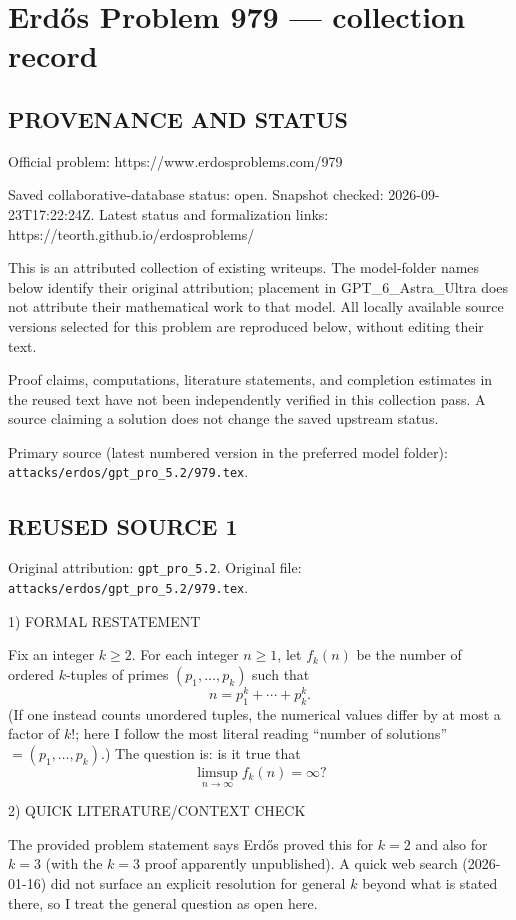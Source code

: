 \section*{Erd\H{o}s Problem 979 --- collection record}

\subsection*{PROVENANCE AND STATUS}
Official problem: https://www.erdosproblems.com/979

Saved collaborative-database status: open.
Snapshot checked: 2026-09-23T17:22:24Z.
Latest status and formalization links: https://teorth.github.io/erdosproblems/

This is an attributed collection of existing writeups. The model-folder names below identify their original attribution; placement in GPT\_6\_Astra\_Ultra does not attribute their mathematical work to that model. All locally available source versions selected for this problem are reproduced below, without editing their text.

Proof claims, computations, literature statements, and completion estimates in the reused text have not been independently verified in this collection pass. A source claiming a solution does not change the saved upstream status.

Primary source (latest numbered version in the preferred model folder): \texttt{attacks/erdos/gpt\_pro\_5.2/979.tex}.

\subsection*{REUSED SOURCE 1}
Original attribution: \texttt{gpt\_pro\_5.2}.
Original file: \texttt{attacks/erdos/gpt\_pro\_5.2/979.tex}.


1) FORMAL RESTATEMENT

Fix an integer $k\ge 2$. For each integer $n\ge 1$, let $f_k(n)$ be the number of ordered $k$-tuples
of primes $(p_1,\dots,p_k)$ such that
\[
n=p_1^k+\cdots+p_k^k.
\]
(If one instead counts unordered tuples, the numerical values differ by at most a factor of $k!$; here I follow the most literal reading ``number of solutions'' $=(p_1,\dots,p_k)$.)
The question is: is it true that
\[
\limsup_{n\to\infty} f_k(n)=\infty?
\]

2) QUICK LITERATURE/CONTEXT CHECK

The provided problem statement says Erd\H{o}s proved this for $k=2$ and also for $k=3$ (with the $k=3$ proof apparently unpublished).
A quick web search (2026-01-16) did not surface an explicit resolution for general $k$ beyond what is stated there, so I treat the general question as open here.

